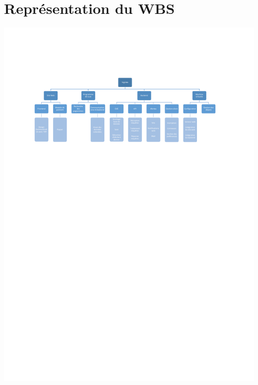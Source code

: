\documentclass[a4paper,12pt]{report}
\begin{document}
\section{Représentation du WBS}

\includegraphics[trim = 2.5cm 0 0 3cm, clip, width=21.5cm]{Organigramme.pdf}



\end{document}
